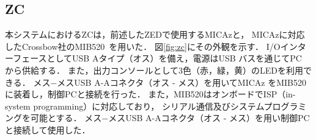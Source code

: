 \documentclass[12pt]{jreport}
\begin{document}



\subsection{ZC}


本システムにおけるZCは，前述したZEDで使用するMICAzと，
MICAzに対応したCrossbow社のMIB520~\cite{Device:}を用いた．
図\ref{fig:zc}にその外観を示す．
I/OインターフェースとしてUSB Aタイプ（オス）を備え，電源はUSB バスを通じてPC から供給する．
また，出力コンソールとして3色（赤，緑，黄）のLEDを利用できる．
メス−メスUSB A-Aコネクタ（オス - メス）を用いてMICAz をMIB520 に装着し，制御PCと接続を行った．
また，MIB520はオンボードでISP（in-system programming）に対応しており，
シリアル通信及びシステムプログラミングを可能とする．
メス−メスUSB A-Aコネクタ（オス - メス）を用い制御PCと接続して使用した．
\end{document}
